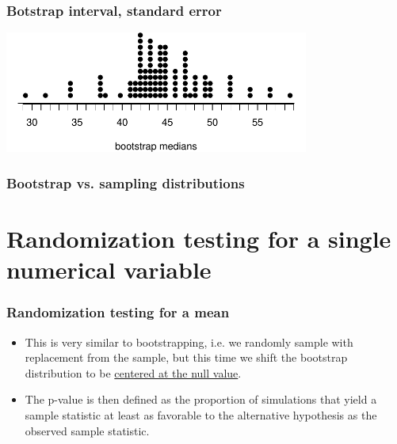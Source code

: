 \documentclass[11pt,containsverbatim,handout,xcolor=xelatex,dvipsnames,table]{beamer}
\newcommand{\soln}[1]{}
\begin{document}
\begin{frame}
\frametitle{Botstrap interval, standard error}


\begin{center}
\includegraphics[width = 0.75\textwidth]{figures/movies/horror_boot_med_dot}
\end{center}

\pause

\soln{\[ 43.5 \pm (1.65 \times 4.88) = (35.45, 51.55) \] }

\end{frame}


\begin{frame}
\frametitle{Bootstrap vs. sampling distributions}

\vfill


\vfill

\end{frame}


\section{Randomization testing for a single numerical variable}


\begin{frame}
\frametitle{Randomization testing for a mean}

\begin{itemize}

\item This is very similar to bootstrapping, i.e. we randomly sample with replacement from the sample, but this time we shift the bootstrap distribution to be \underline{centered at the null value}. 

\pause

\item The p-value is then defined as the proportion of simulations that yield a sample statistic at least as favorable to the alternative hypothesis as the observed sample statistic.

\end{itemize}

\end{frame}
\end{document}
